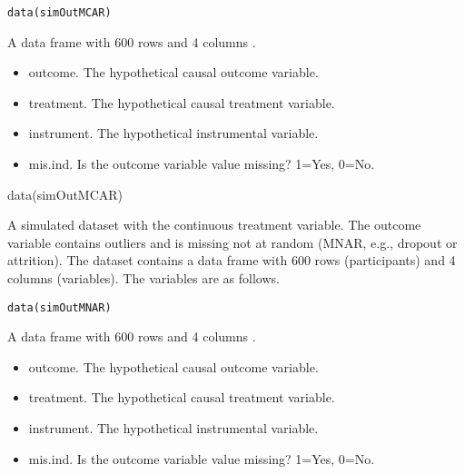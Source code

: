\documentclass[a4paper]{book}
\begin{document}
%
\begin{Usage}
\begin{verbatim}
data(simOutMCAR)
\end{verbatim}
\end{Usage}
%
\begin{Format}
A data frame with 600 rows and 4 columns .
\end{Format}
%
\begin{Details}\relax
\begin{itemize}

\item outcome. The hypothetical causal outcome variable.
\item treatment. The hypothetical causal treatment variable.
\item instrument. The hypothetical instrumental variable.
\item mis.ind. Is the outcome variable value missing? 1=Yes, 0=No.

\end{itemize}

\end{Details}
%
\begin{Examples}
\begin{ExampleCode}

data(simOutMCAR)


\end{ExampleCode}
\end{Examples}
%
\begin{Description}\relax
A simulated dataset with the continuous treatment variable. The outcome variable contains
outliers and is missing not at random (MNAR, e.g., dropout or attrition).
The dataset contains a data frame with 600 rows (participants) and 4 columns (variables).
The variables are as follows.
\end{Description}
%
\begin{Usage}
\begin{verbatim}
data(simOutMNAR)
\end{verbatim}
\end{Usage}
%
\begin{Format}
A data frame with 600 rows and 4 columns .
\end{Format}
%
\begin{Details}\relax
\begin{itemize}

\item outcome. The hypothetical causal outcome variable.
\item treatment. The hypothetical causal treatment variable.
\item instrument. The hypothetical instrumental variable.
\item mis.ind. Is the outcome variable value missing? 1=Yes, 0=No.

\end{itemize}

\end{Details}
\end{document}
